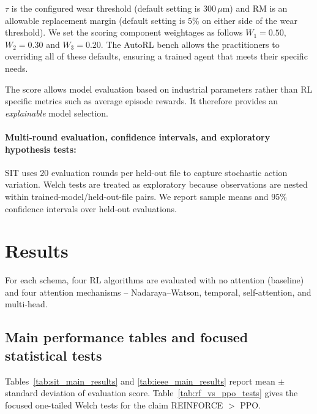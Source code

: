 \documentclass[sn-basic]{sn-jnl}%
\begin{document}
$\tau$ is the configured wear threshold (default setting is $300\,\mu\mathrm{m}$) and $\mathrm{RM}$ is an allowable replacement margin (default setting is 5\% on either side of the wear threshold). We set the scoring component weightages as follows $W_1 = 0.50$, $W_2 = 0.30$ and $W_3 = 0.20$. The AutoRL bench allows the practitioners to overriding all of these defaults, ensuring a trained agent that meets their specific needs. 

The score allows model evaluation based on industrial parameters rather than RL specific metrics such as average episode rewards. It therefore provides an \emph{explainable} model selection.  

\paragraph{Multi-round evaluation, confidence intervals, and exploratory hypothesis tests:}
SIT uses 20 evaluation rounds per held-out file to capture stochastic action variation. Welch tests are treated as exploratory because observations are nested within trained-model/held-out-file pairs. We report sample means and 95\% confidence intervals over held-out evaluations.

\section{Results} \label{sec:results} %
For each schema, four RL algorithms are evaluated with no attention (baseline) and four attention mechanisms -- Nadaraya--Watson, temporal, self-attention, and multi-head.

\subsection{Main performance tables and focused statistical tests}
\label{sec:hypothesis_tests}

Tables~\ref{tab:sit_main_results} and \ref{tab:ieee_main_results} report mean $\pm$ standard deviation of evaluation score. Table~\ref{tab:rf_vs_ppo_tests} gives the focused one-tailed Welch tests for the claim \textsc{REINFORCE} $>$ \textsc{PPO}.
\end{document}
